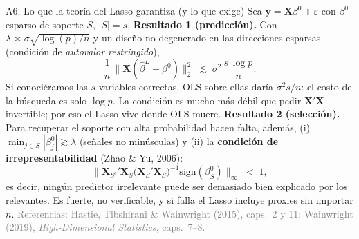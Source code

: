 \documentclass{beamer}
\newcommand{\1}{\mathbb{I}}
\newcommand{\sign}{\mathrm{sign}}
\begin{document}
\begin{frame}{A6. Lo que la teoría del Lasso garantiza (y lo que exige)}
\small
Sea $\mathbf{y} = \mathbf{X}\beta^0 + \varepsilon$ con $\beta^0$ esparso de soporte $S$, $|S| = s$.
\pause
\vspace{0.05cm}
\textbf{Resultado 1 (predicción).} Con $\lambda \asymp \sigma\sqrt{\log(p)/n}$ y un diseño no degenerado en las direcciones esparsas (condición de \emph{autovalor restringido}),
\[ \frac{1}{n}\,\big\|\mathbf{X}(\hat{\beta}^L - \beta^0)\big\|_2^2 \;\lesssim\; \sigma^2\,\frac{s\,\log p}{n}. \]
Si conociéramos las $s$ variables correctas, OLS sobre ellas daría $\sigma^2 s/n$: el costo de la búsqueda es solo $\log p$. La condición es mucho más débil que pedir $\mathbf{X}'\mathbf{X}$ invertible; por eso el Lasso vive donde OLS muere.
\pause
\vspace{0.05cm}
\textbf{Resultado 2 (selección).} Para recuperar el soporte con alta probabilidad hacen falta, además, (i) $\min_{j \in S}|\beta^0_j| \gtrsim \lambda$ (señales no minúsculas) y (ii) la \textbf{condición de irrepresentabilidad} (Zhao \& Yu, 2006):
\[ \big\| \mathbf{X}_{S^c}'\mathbf{X}_S \big(\mathbf{X}_S'\mathbf{X}_S\big)^{-1} \sign(\beta^0_S) \big\|_\infty \;<\; 1, \]
es decir, ningún predictor irrelevante puede ser demasiado bien explicado por los relevantes. Es fuerte, no verificable, y si falla el Lasso incluye proxies sin importar $n$.
\pause
\vspace{0.05cm}
\textcolor{gray}{Referencias: Hastie, Tibshirani \& Wainwright (2015), caps.\ 2 y 11; Wainwright (2019), \emph{High-Dimensional Statistics}, caps.\ 7--8.}
\end{frame}

\end{document}
